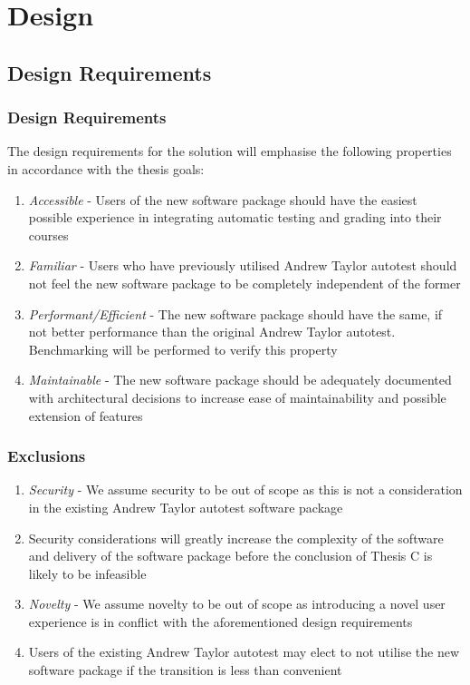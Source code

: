 \documentclass[xcolor]{beamer}
\begin{document}
\section{Design}
\subsection{Design Requirements}
\begin{frame}
	\frametitle{Design Requirements}
	The design requirements for the solution will emphasise the following properties in accordance with the thesis goals:\\
	\begin{enumerate}
		\setlength\itemsep{0.5em}
		\item \textit{Accessible} - Users of the new software package should have the easiest possible experience in integrating automatic testing and grading into their courses
			\pause
		\item \textit{Familiar} - Users who have previously utilised Andrew Taylor autotest should not feel the new software package to be completely independent of the former 
			\pause
		\item \textit{Performant/Efficient} - The new software package should have the same, if not better performance than the original Andrew Taylor autotest. Benchmarking will be performed to verify this property
			\pause
		\item \textit{Maintainable} - The new software package should be adequately documented with architectural decisions to increase ease of maintainability and possible extension of features
	\end{enumerate}
\end{frame}
\begin{frame}
	\frametitle{Exclusions}
	\begin{enumerate}
		\setlength\itemsep{1em}
		\item \textit{Security} - We assume security to be out of scope as this is not a consideration in the existing Andrew Taylor autotest software package
			\pause
		\item Security considerations will greatly increase the complexity of the software and delivery of the software package before the conclusion of Thesis C is likely to be infeasible
			\pause
		\item \textit{Novelty} - We assume novelty to be out of scope as introducing a novel user experience is in conflict with the aforementioned design requirements
			\pause
		\item Users of the existing Andrew Taylor autotest may elect to not utilise the new software package if the transition is less than convenient
	\end{enumerate}
\end{frame}
\end{document}
